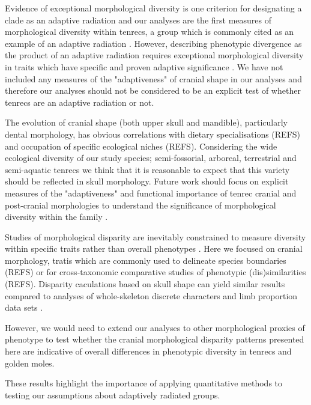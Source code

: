 \documentclass[12pt,a4paper]{article}
\begin{document}

 	Evidence of exceptional morphological diversity is one criterion for designating a clade as an adaptive radiation \citep{Losos2010a} and our analyses are the first measures of morphological diversity within tenrecs, a group which is commonly cited as an example of an adaptive radiation \citep{Olson2013}.  However, describing phenotypic divergence as the product of an adaptive radiation requires exceptional morphological diversity in traits which have specific and proven adaptive significance \citep{Losos2010a}. We have not included any measures of the "adaptiveness" of cranial shape in our analyses and therefore our analyses should not be considered to be an explicit test of whether tenrecs are an adaptive radiation or not. 
 	
 	The evolution of cranial shape (both upper skull and mandible), particularly dental morphology, has obvious correlations with dietary specialisations (REFS) and occupation of specific ecological niches (REFS). Considering the wide ecological diversity of our study species; semi-fossorial, arboreal, terrestrial and semi-aquatic tenrecs \citep{Soarimalala2011} we think that it is reasonable to expect that this variety should be reflected in skull morphology. Future work should focus on explicit measures of the "adaptiveness" and functional importance of tenrec cranial and post-cranial morphologies to understand the significance of morphological diversity within the family \citep[e.g.][]{Mahler2010}. 

	Studies of morphological disparity are inevitably constrained to measure diversity within specific traits rather than overall phenotypes \citep{Roy1997}. Here we focused on cranial morphology, tratis which are commonly used to delineate species boundaries (REFS) or for cross-taxonomic comparative studies of phenotypic (dis)similarities (REFS). Disparity caculations based on skull shape can yield similar results compared to analyses of whole-skeleton discrete characters and limb proportion data sets \citep{Foth2012}. 
	
	However, we would need to extend our analyses to other morphological proxies of phenotype to test whether the cranial morphological disparity patterns presented here are indicative of overall differences in phenotypic diversity in tenrecs and golden moles. 
	




	These results highlight the importance of applying quantitative methods to testing our assumptions about adaptively radiated groups. 
\end{document}
